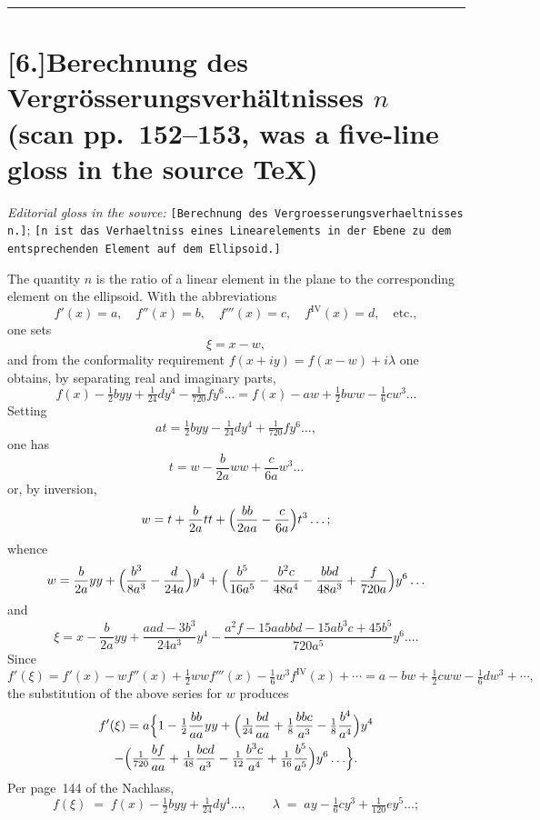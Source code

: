 \documentclass[12pt,a4paper]{article}
\begin{document}
\bigskip
\hrule
\bigskip

\section*{[6.]\quad Berechnung des Vergr\"osserungsverh\"altnisses $n$\\
(scan pp.~152--153, was a five-line gloss in the source TeX)}

\textit{Editorial gloss in the source:} \texttt{[Berechnung des
Vergroesserungsverhaeltnisses n.]}; \texttt{[n ist das Verhaeltniss
eines Linearelements in der Ebene zu dem entsprechenden Element auf
dem Ellipsoid.]}

The quantity $n$ is the ratio of a linear element in the plane to the
corresponding element on the ellipsoid. With the abbreviations
\[
   f'(x)=a,\quad f''(x)=b,\quad f'''(x)=c,\quad f^{\mathrm{IV}}(x)=d,
   \quad\text{etc.},
\]
one sets
\[
   \xi=x-w,
\]
and from the conformality requirement $f(x+iy)=f(x-w)+i\lambda$
one obtains, by separating real and imaginary parts,
\[
   f(x)-\tfrac{1}{2}byy+\tfrac{1}{24}dy^{4}-\tfrac{1}{720}fy^{6}\ldots
     =f(x)-aw+\tfrac{1}{2}bww-\tfrac{1}{6}cw^{3}\ldots
\]
Setting
\[
   at=\tfrac{1}{2}byy-\tfrac{1}{24}dy^{4}+\tfrac{1}{720}fy^{6}\ldots,
\]
one has
\[
   t=w-\frac{b}{2a}ww+\frac{c}{6a}w^{3}\ldots
\]
or, by inversion,
\[
   w=t+\frac{b}{2a}tt+\Bigl(\frac{bb}{2aa}-\frac{c}{6a}\Bigr)t^{3}\ldots;
\]
whence
\[
   w=\frac{b}{2a}yy+\Bigl(\frac{b^{3}}{8a^{3}}-\frac{d}{24a}\Bigr)y^{4}
      +\Bigl(\frac{b^{5}}{16a^{5}}-\frac{b^{2}c}{48a^{4}}
                -\frac{bbd}{48a^{3}}+\frac{f}{720a}\Bigr)y^{6}\ldots
\]
and
\[
   \xi=x-\frac{b}{2a}yy+\frac{aad-3b^{3}}{24a^{3}}y^{4}
      -\frac{a^{2}f-15aabbd-15ab^{3}c+45b^{5}}{720a^{5}}y^{6}\ldots.
\]
Since
\[
   f'(\xi)=f'(x)-wf''(x)+\tfrac{1}{2}wwf'''(x)
            -\tfrac{1}{6}w^{3}f^{\mathrm{IV}}(x)+\cdots
         =a-bw+\tfrac{1}{2}cww-\tfrac{1}{6}dw^{3}+\cdots,
\]
the substitution of the above series for $w$ produces
\begin{multline*}
   f'(\xi)=a\Bigl\{1-\tfrac{1}{2}\frac{bb}{aa}yy
       +\Bigl(\tfrac{1}{24}\frac{bd}{aa}+\tfrac{1}{8}\frac{bbc}{a^{3}}
              -\tfrac{1}{8}\frac{b^{4}}{a^{4}}\Bigr)y^{4}\\
       -\Bigl(\tfrac{1}{720}\frac{bf}{aa}+\tfrac{1}{48}\frac{bcd}{a^{3}}
              -\tfrac{1}{12}\frac{b^{3}c}{a^{4}}
              +\tfrac{1}{16}\frac{b^{5}}{a^{5}}\Bigr)y^{6}\ldots\Bigr\}.
\end{multline*}
Per page~144 of the Nachlass,
\[
   f(\xi)\;=\;f(x)-\tfrac{1}{2}byy+\tfrac{1}{24}dy^{4}\ldots,
   \qquad \lambda\;=\;ay-\tfrac{1}{6}cy^{3}+\tfrac{1}{120}ey^{5}\ldots;
\]
\end{document}
